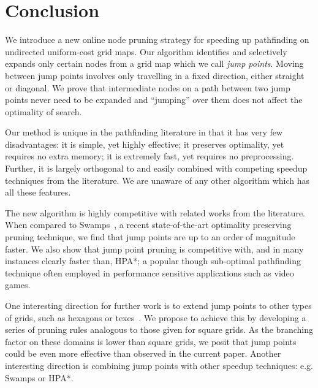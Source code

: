 \section{Conclusion}
We introduce a new online node pruning strategy for speeding
up pathfinding on undirected uniform-cost grid maps.  Our algorithm identifies
and selectively expands only certain nodes from a grid map which we call
\emph{jump points}.  Moving between jump points involves only travelling in a
fixed direction, either straight or diagonal.  We prove that intermediate nodes
on a path between two jump points never need to be expanded and ``jumping'' over
them does not affect the optimality of search.
\par
Our method is unique in the pathfinding literature in that it has very few
disadvantages: it is simple, yet highly effective; it preserves optimality, yet
requires no extra memory;  it is extremely fast, yet requires no preprocessing.
Further, it is largely orthogonal to and easily combined with 
competing speedup techniques from the literature.
We are unaware of any other algorithm which has all these features.
\par
The new algorithm is highly competitive with related works from the literature.
When compared to Swamps~\cite{pochter10}, 
a recent state-of-the-art optimality preserving pruning
technique, we find that jump points are up to an order of magnitude faster.
We also show that jump point pruning is competitive with, and in
many instances clearly faster than, HPA*; a popular though sub-optimal pathfinding
technique often employed in performance sensitive applications such as
video games.
\par
One interesting direction for further work is to extend jump points to other
types of grids, such as hexagons or texes~\cite{yap02}.
We propose to achieve this by developing  a series of pruning rules analogous 
to those given for square grids. 
As the branching factor on these domains is lower than square grids, we posit
that jump points could be even more effective than observed in the current paper.
Another interesting direction is combining jump points with other
speedup techniques: e.g. Swamps or HPA*.
